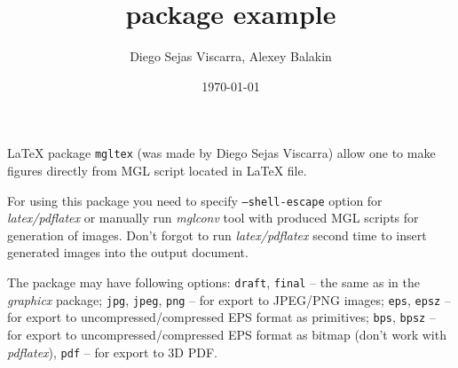 \documentclass[12pt]{article}
\title{\mglTeX{} package example}
\author{Diego Sejas Viscarra, Alexey Balakin}
\date{\today}
\begin{document}
  
\maketitle


LaTeX package \texttt{mgltex} (was made by Diego Sejas Viscarra) allow one to make figures directly from MGL script located in LaTeX file.

For using this package you need to specify \texttt{--shell-escape} option for \emph{latex/pdflatex} or manually run \emph{mglconv} tool with produced MGL scripts for generation of images. Don't forgot to run \emph{latex/pdflatex} second time to insert generated images into the output document.

The package may have following options: \texttt{draft}, \texttt{final} -- the same as in the \emph{graphicx} package; \texttt{jpg}, \texttt{jpeg}, \texttt{png} -- for export to JPEG/PNG images; \texttt{eps}, \texttt{epsz} -- for export to uncompressed/compressed EPS format as primitives; \texttt{bps}, \texttt{bpsz} -- for export to uncompressed/compressed EPS format as bitmap (don't work with \emph{pdflatex}), \texttt{pdf} -- for export to 3D PDF.
\end{document}
